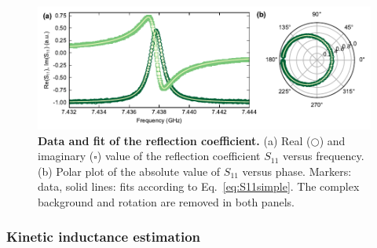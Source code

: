 \begin{figure}
	\centering
	\includegraphics[width=\linewidth]{chapter-currentdetection/figures/SM_reflection_coefficient}
	\caption{
		\textbf{Data and fit of the reflection coefficient.}
		(a) Real ($\bigcirc$) and imaginary ($\square$) value of the reflection coefficient $S_{11}$ versus frequency.
		(b) Polar plot of the absolute value of $S_{11}$ versus phase.
		Markers: data, solid lines: fits according to Eq.~\eqref{eq:S11simple}.
		The complex background and rotation are removed in both panels.
		\label{fig:s11fitabs}
	}
\end{figure}


\subsubsection{Kinetic inductance estimation}\label{sec:Lk}

